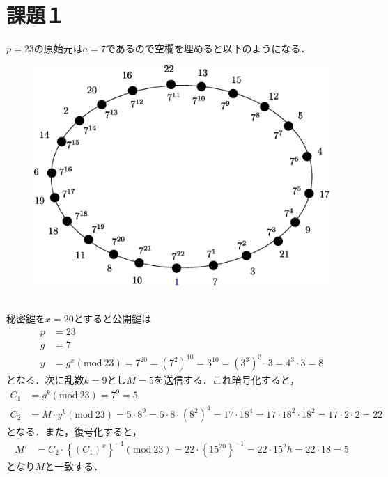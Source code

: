 \documentclass[a4paper,12pt]{jarticle}
\begin{document}
%
\title{\vspace{-30mm} }
\date{}
%
\maketitle
%
\vspace{-30mm}
%
\setlength{\abovedisplayskip}{0pt} %
\setlength{\belowdisplayskip}{0pt} %

\section*{課題１}
\vspace{-4mm}
$p=23$の原始元は$a=7$であるので空欄を埋めると以下のようになる．
%
\begin{figure}[hbp]
 \begin{center}
  \includegraphics[width=120mm]{fig/elga.eps}
 \end{center}
 \label{fig:elga}
\end{figure}
%
\\秘密鍵を$x=20$とすると公開鍵は
%
\begin{align}
 p&=23 \\
 g&=7 \\
 y&=g^x (\mathrm{mod}~23)=7^{20}=(7^2)^{10}=3^{10}=(3^3)^3\cdot3=4^3\cdot3=8
\end{align}
%
となる．次に乱数$k=9$とし$M=5$を送信する．これ暗号化すると，
%
\begin{align}
 C_1&=g^k (\mathrm{mod}~23)=7^9=5\\
 C_2&=M \cdot y^k (\mathrm{mod}~23)=5\cdot8^9=5\cdot8 \cdot(8^2)^4 =17\cdot18^4=17\cdot18^2\cdot18^2 =17\cdot2\cdot2=22 
\end{align}
%
となる．また，復号化すると，
%
\begin{align}
 M'&=C_2\cdot \left\{ (C_1)^x \right\}^{-1} (\mathrm{mod}~23)=22\cdot \left\{15^{20}\right\}^{-1} =22\cdot 15^2 h=22\cdot18=5
\end{align}
%
となり$M$と一致する．
\vspace{-5mm}
\end{document}
